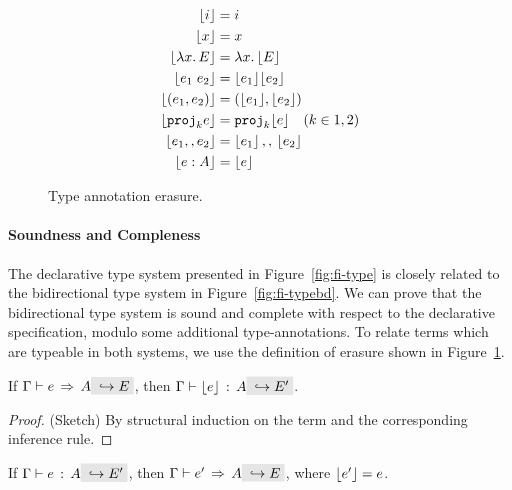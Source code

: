 \begin{figure}[t]
  \begin{align*}
    \lfloor i \rfloor                   &= i \\
    \lfloor x \rfloor                   &= x \\
    \lfloor \lambda x.\, E \rfloor            &= \lambda x.\, \lfloor E \rfloor \\
    \lfloor e_1 \; e_2 \rfloor    &= {\lfloor e_1 \rfloor} {\lfloor e_2 \rfloor} \\
    \lfloor (e_1, e_2) \rfloor   &= (\lfloor e_1 \rfloor, \lfloor e_2 \rfloor) \\
    \lfloor {\texttt{proj}}_{k} e \rfloor           &= {\texttt{proj}}_{k} \lfloor e \rfloor \quad (k \in {1,2}) \\ 
    \lfloor {e_1} ,, {e_2} \rfloor      &= {\lfloor e_1 \rfloor} \, ,, \, {\lfloor e_2 \rfloor} \\
    \lfloor e : A \rfloor               &= {\lfloor e \rfloor} 
  \end{align*}
  \caption{Type annotation erasure.}
  \label{fig:type-ann-erasure}
\end{figure}

\paragraph{Soundness and Compleness} The declarative type system presented in
Figure~\ref{fig:fi-type} is closely related to the bidirectional type system 
in Figure~\ref{fig:fi-typebd}. We can prove that the bidirectional type system 
is sound and complete with respect to the declarative specification, 
modulo some additional type-annotations. To relate terms which are
typeable in both systems, we use the definition of erasure shown in Figure~\ref{fig:type-ann-erasure}.

\begin{theorem}
If $ \jinfer \Gamma e A \yields E$, then $ \jtype \Gamma {\erase e} A \yields {E'} $.
\end{theorem}

\begin{proof}
  (Sketch) By structural induction on the term and the corresponding
  inference rule.
\end{proof}

\begin{theorem}
If $ \jtype \Gamma e A \yields {E'}$, then $ \jinfer \Gamma {e'} A \yields E$, where $\lfloor e' \rfloor = e$.
\end{theorem}

